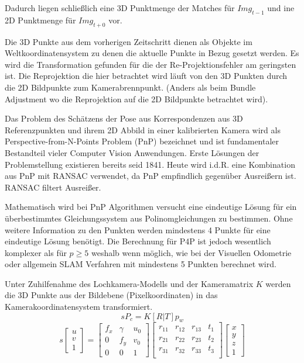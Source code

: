 Dadurch liegen schlie{\ss}lich eine 3D Punktmenge der Matches für $Img_{t-1}$ und ine 2D Punktmenge für $Img_{t+0}$ vor.

Die 3D Punkte aus dem vorherigen Zeitschritt dienen als Objekte im Weltkoordinatensystem zu denen die aktuelle Punkte in Bezug gesetzt werden. Es wird die Transformation gefunden für die der Re-Projektionsfehler am geringsten ist. Die Reprojektion die hier betrachtet wird läuft von den 3D Punkten durch die 2D Bildpunkte zum Kamerabrennpunkt. (Anders als beim Bundle Adjustment wo die Reprojektion auf die 2D Bildpunkte betrachtet wird).


Das Problem des Schätzens der Pose aus Korrespondenzen aus 3D Referenzpunkten und ihrem 2D Abbild in einer kalibrierten Kamera wird als Perspective-from-N-Points Problem (PnP) bezeichnet und ist fundamentaler Bestandteil vieler Computer Vision Anwendungen. Erste Lösungen der Problemstellung existieren bereits seid 1841. Heute wird i.d.R. eine Kombination aus PnP mit RANSAC verwendet, da PnP empfindlich gegenüber Ausrei{\ss}ern ist. RANSAC filtert Ausrei{\ss}er.

Mathematisch wird bei PnP Algorithmen versucht eine eindeutige Lösung für ein überbestimmtes Gleichungssystem aus Polinomgleichungen zu bestimmen. Ohne weitere Information zu den Punkten werden mindestens 4 Punkte für eine eindeutige Lösung benötigt. Die Berechnung für P4P ist jedoch wesentlich komplexer als für $p \geq 5$ weshalb wenn möglich, wie bei der Visuellen Odometrie oder allgemein SLAM Verfahren mit mindestens 5 Punkten berechnet wird.
\newline

Unter Zuhilfenahme des Lochkamera-Modells und der Kameramatrix $K$ werden die 3D Punkte aus der Bildebene (Pixelkoordinaten) in das Kamerakoordinatensystem transformiert.
%
\begin{equation}
\label{eq:sshort}
    sP_{c} = K[R | T]p_{w}
\end{equation}
%
\begin{equation}
  s 
  \begin{bmatrix}u\\v\\1\end{bmatrix} = \begin{bmatrix}
  f_x & \gamma & u_0\\
  0 & f_y & v_0\\
  0 & 0 & 1
  \end{bmatrix}\begin{bmatrix}
  r_{11} & r_{12} & r_{13} & t_{1}\\
  r_{21} & r_{22} & r_{23} & t_{2}\\
  r_{31} & r_{32} & r_{33} & t_{3}\\
  \end{bmatrix}
\begin{bmatrix}x\\y\\z\\1\end{bmatrix}
\end{equation}

